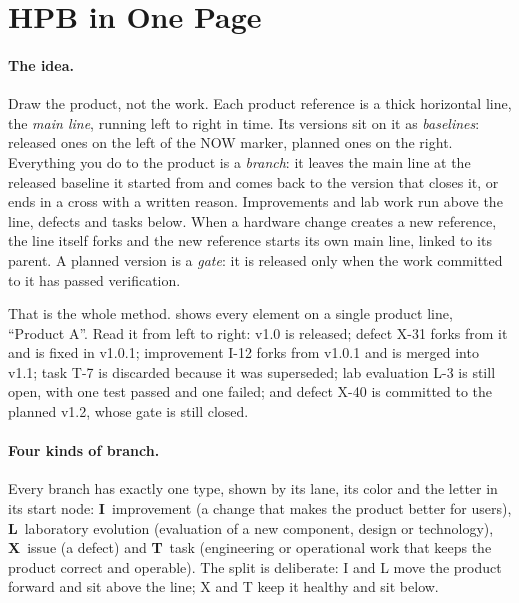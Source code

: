 \section{HPB in One Page}
\label{sec:onepage}

\paragraph{The idea.}
Draw the product, not the work. Each product reference is a thick
horizontal line, the \emph{main line}, running left to right in time. Its
versions sit on it as \emph{baselines}: released ones on the left of the
NOW marker, planned ones on the right. Everything you do to the product is
a \emph{branch}: it leaves the main line at the released baseline it
started from and comes back to the version that closes it, or ends in a
cross with a written reason. Improvements and lab work run above the line,
defects and tasks below. When a hardware change creates a new reference,
the line itself forks and the new reference starts its own main line,
linked to its parent. A planned version is a \emph{gate}: it is released
only when the work committed to it has passed verification.

That is the whole method.  shows every element on a
single product line, ``Product A''. Read it from left to right: v1.0 is
released; defect X-31 forks from it and is fixed in v1.0.1; improvement
I-12 forks from v1.0.1 and is merged into v1.1; task T-7 is discarded
because it was superseded; lab evaluation L-3 is still open, with one test
passed and one failed; and defect X-40 is committed to the planned v1.2,
whose gate is still closed.



\paragraph{Four kinds of branch.}
Every branch has exactly one type, shown by its lane, its color and the
letter in its start node: \textbf{I}~improvement (a change that makes the
product better for users), \textbf{L}~laboratory evolution (evaluation of
a new component, design or technology), \textbf{X}~issue (a defect) and
\textbf{T}~task (engineering or operational work that keeps the product
correct and operable). The split is deliberate: I and L move the product
forward and sit above the line; X and T keep it healthy and sit below.

